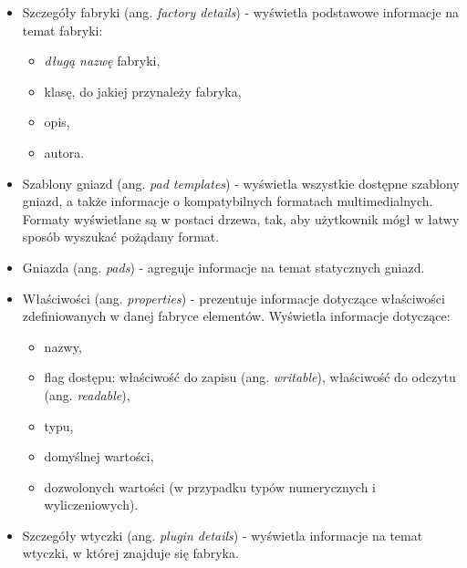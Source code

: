 \documentclass[12pt]{article}
\begin{document}
\begin{itemize}
  \setlength{\itemsep}{0em}
\item Szczegóły fabryki (ang. \textit{factory details}) - wyświetla podstawowe informacje na temat fabryki:
  \begin{itemize}
    \setlength{\itemsep}{0em}
  \item \textit{długą nazwę} fabryki,
  \item klasę, do jakiej przynależy fabryka,
  \item opis,
  \item autora.
  \end{itemize}
\item Szablony gniazd (ang. \textit{pad templates}) - wyświetla wszystkie dostępne szablony gniazd, a także informacje o kompatybilnych formatach multimedialnych. Formaty wyświetlane są w postaci drzewa, tak, aby użytkownik mógł w łatwy sposób wyszukać pożądany format.
\item Gniazda (ang. \textit{pads}) - agreguje informacje na temat statycznych gniazd.
\item Właściwości (ang. \textit{properties}) - prezentuje informacje dotyczące właściwości zdefiniowanych w danej fabryce elementów. Wyświetla informacje dotyczące:
  \begin{itemize}
    \setlength{\itemsep}{0em}
  \item nazwy,
  \item flag dostępu: właściwość do zapisu (ang. \textit{writable}), właściwość do odczytu (ang. \textit{readable}),
  \item typu,
  \item domyślnej wartości,
  \item dozwolonych wartości (w przypadku typów numerycznych i wyliczeniowych).
  \end{itemize}
\item Szczegóły wtyczki (ang. \textit{plugin details}) - wyświetla informacje na temat wtyczki, w której znajduje się fabryka.
\end{itemize}
\end{document}
